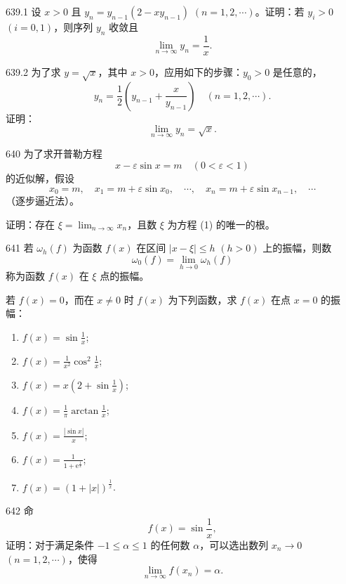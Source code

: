 \begin{prob}[M]{639.1}
设 $x > 0$ 且 $y_n = y_{n-1}(2 - x y_{n-1})$ $(n = 1, 2, \cdots)$。证明：若 $y_i > 0$ $(i = 0, 1)$，则序列 $y_n$ 收敛且
\[
\lim_{n \to \infty} y_n = \frac{1}{x}.
\]
\end{prob}

\begin{prob}[M]{639.2}
为了求 $y = \sqrt{x}$，其中 $x > 0$，应用如下的步骤：$y_0 > 0$ 是任意的，
\[
y_n = \frac{1}{2}\left(y_{n-1} + \frac{x}{y_{n-1}}\right) \quad (n = 1, 2, \cdots).
\]
证明：
\[
\lim_{n \to \infty} y_n = \sqrt{x}.
\]
\end{prob}

\begin{prob}[L]{640}
为了求开普勒方程
\[
x - \varepsilon \sin x = m \quad (0 < \varepsilon < 1) \tag{1}
\]
的近似解，假设
\[
x_0 = m, \quad x_1 = m + \varepsilon \sin x_0, \quad \cdots, \quad x_n = m + \varepsilon \sin x_{n-1}, \quad \cdots
\]
（逐步逼近法）。

证明：存在 $\xi = \lim_{n \to \infty} x_n$，且数 $\xi$ 为方程 (1) 的唯一的根。
\end{prob}

\begin{prob}[L]{641}
若 $\omega_h(f)$ 为函数 $f(x)$ 在区间 $|x - \xi| \leqslant h$ $(h > 0)$ 上的振幅，则数
\[
\omega_0(f) = \lim_{h \to 0} \omega_h(f)
\]
称为函数 $f(x)$ 在 $\xi$ 点的振幅。

若 $f(x) = 0$，而在 $x \neq 0$ 时 $f(x)$ 为下列函数，求 $f(x)$ 在点 $x = 0$ 的振幅：
\begin{enumerate}[label=(\alph*), itemsep=2pt, topsep=3pt]
\item $f(x) = \sin\frac{1}{x}$;
\item $f(x) = \frac{1}{x^2}\cos^2\frac{1}{x}$;
\item $f(x) = x\left(2 + \sin\frac{1}{x}\right)$;
\item $f(x) = \frac{1}{\pi}\arctan\frac{1}{x}$;
\item $f(x) = \frac{|\sin x|}{x}$;
\item $f(x) = \frac{1}{1 + \mathrm{e}^{\frac{1}{x}}}$;
\item $f(x) = (1 + |x|)^{\frac{1}{x}}$.
\end{enumerate}
\end{prob}

\begin{prob}[M]{642}
命
\[
f(x) = \sin\frac{1}{x},
\]
证明：对于满足条件 $-1 \leqslant \alpha \leqslant 1$ 的任何数 $\alpha$，可以选出数列 $x_n \to 0$ $(n = 1, 2, \cdots)$，使得
\[
\lim_{n \to \infty} f(x_n) = \alpha.
\]
\end{prob}

